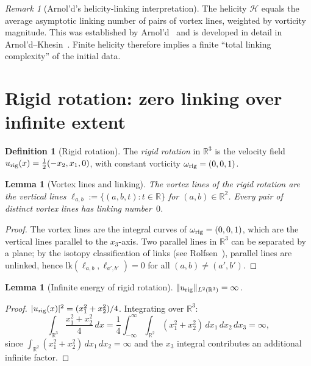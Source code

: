 \documentclass[11pt]{amsart}
\newtheorem{lemma}[theorem]{Lemma}
\theoremstyle{definition}
\newtheorem{definition}[theorem]{Definition}
\theoremstyle{remark}
\newtheorem{remark}[theorem]{Remark}
\newcommand{\R}{\mathbb{R}}
\begin{document}
\begin{remark}[Arnol'd's helicity-linking interpretation]
The helicity $\mathcal{H}$ equals the average asymptotic linking
number of pairs of vortex lines, weighted by vorticity magnitude.
This was established by Arnol'd~\cite{Arnold} and is developed in
detail in Arnol'd--Khesin~\cite[\S III.1]{ArnoldKhesin}.
Finite helicity therefore implies a finite ``total linking complexity''
of the initial data.
\end{remark}

\section{Rigid rotation: zero linking over infinite extent}\label{sec:rigid}

\begin{definition}[Rigid rotation]\label{def:rigid}
The \emph{rigid rotation} in $\R^3$ is the velocity field
$u_{\rm rig}(x)=\frac{1}{2}(-x_2,x_1,0)$,
with constant vorticity $\omega_{\rm rig}=(0,0,1)$.
\end{definition}

\begin{lemma}[Vortex lines and linking]\label{lem:rigid-linking}
The vortex lines of the rigid rotation are the vertical lines
$\ell_{a,b}:=\{(a,b,t):t\in\R\}$ for $(a,b)\in\R^2$.
Every pair of distinct vortex lines has linking number~$0$.
\end{lemma}
\begin{proof}
The vortex lines are the integral curves of
$\omega_{\rm rig}=(0,0,1)$, which are the vertical lines parallel to
the $x_3$-axis.
Two parallel lines in $\R^3$ can be separated by a plane; by the
isotopy classification of links (see Rolfsen~\cite[\S 5A]{Rolfsen}),
parallel lines are unlinked, hence $\mathrm{lk}(\ell_{a,b},\ell_{a',b'})=0$
for all $(a,b)\neq(a',b')$.
\end{proof}

\begin{lemma}[Infinite energy of rigid rotation]\label{lem:rigid-infinite}
$\|u_{\rm rig}\|_{L^2(\R^3)}=\infty$.
\end{lemma}
\begin{proof}
$|u_{\rm rig}(x)|^2=(x_1^2+x_2^2)/4$.
Integrating over $\R^3$:
\[
\int_{\R^3}\frac{x_1^2+x_2^2}{4}\,dx
=\frac14\int_{-\infty}^\infty\!\int_{\R^2}(x_1^2+x_2^2)\,dx_1\,dx_2\,dx_3
=\infty,
\]
since $\int_{\R^2}(x_1^2+x_2^2)\,dx_1\,dx_2=\infty$ and the $x_3$
integral contributes an additional infinite factor.
\end{proof}
\end{document}

